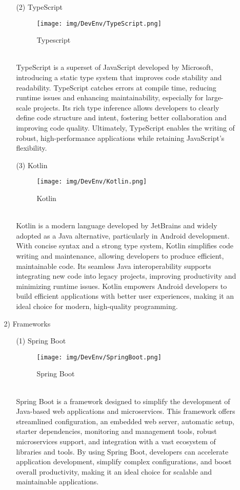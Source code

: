 \documentclass[conference]{IEEEtran}
\begin{document}
\begin{enumerate}
\begin{itemize}
\begin{itemize}
\item [(2)] TypeScript\cite{Typescript}
\begin{figure}[h]
\centering
\texttt{[image: img/DevEnv/TypeScript.png]}
\centering
\caption{Typescript} 
\end{figure}\\
TypeScript is a superset of JavaScript developed by Microsoft, introducing a static type system that improves code stability and readability. TypeScript catches errors at compile time, reducing runtime issues and enhancing maintainability, especially for large-scale projects. Its rich type inference allows developers to clearly define code structure and intent, fostering better collaboration and improving code quality. Ultimately, TypeScript enables the writing of robust, high-performance applications while retaining JavaScript’s flexibility.\\

\item [(3)] Kotlin\cite{Kotlin}
\begin{figure}[h]
\centering
\texttt{[image: img/DevEnv/Kotlin.png]}\centering
\caption{Kotlin} 
\end{figure}\\
Kotlin is a modern language developed by JetBrains and widely adopted as a Java alternative, particularly in Android development. With concise syntax and a strong type system, Kotlin simplifies code writing and maintenance, allowing developers to produce efficient, maintainable code. Its seamless Java interoperability supports integrating new code into legacy projects, improving productivity and minimizing runtime issues. Kotlin empowers Android developers to build efficient applications with better user experiences, making it an ideal choice for modern, high-quality programming.\\

\end{itemize}
\item [2)] Frameworks
\begin{itemize}
\item [(1)] Spring Boot\cite{SpringBoot}
\begin{figure}[h]
\centering
\texttt{[image: img/DevEnv/SpringBoot.png]}
\caption{Spring Boot} 
\end{figure}\\
Spring Boot is a framework designed to simplify the development of Java-based web applications and microservices. This framework offers streamlined configuration, an embedded web server, automatic setup, starter dependencies, monitoring and management tools, robust microservices support, and integration with a vast ecosystem of libraries and tools. By using Spring Boot, developers can accelerate application development, simplify complex configurations, and boost overall productivity, making it an ideal choice for scalable and maintainable applications.\\


\end{itemize}
\end{itemize}
\end{enumerate}
\end{document}
